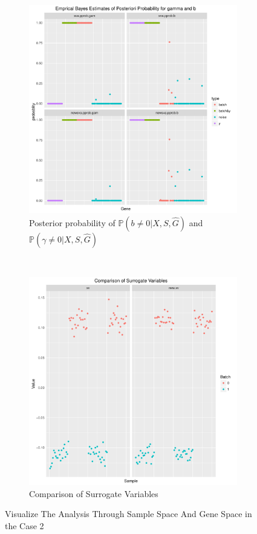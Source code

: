 \documentclass[11pt]{article}
\begin{document}
\begin{figure}[h!]
    \centering
    \begin{subfigure}[t]{0.46\textwidth}
    \centering
    \includegraphics[width = \textwidth]{figures/pprop0.pdf}
    \caption{Posterior probability of $\mathbb{P}(b \neq 0 | X, S, \hat{G})$ and $\mathbb{P}(\gamma \neq 0 | X, S, \hat{G})$}
    \end{subfigure}
~    
    \begin{subfigure}[t]{0.46\textwidth}
    \centering
    \includegraphics[width = \textwidth]{figures/vector0.pdf}
    \caption{Comparison of Surrogate Variables}
    \end{subfigure}
    \caption{Visualize The Analysis Through Sample Space And Gene Space in the Case 2}
\end{figure}

\newpage




\end{document}
